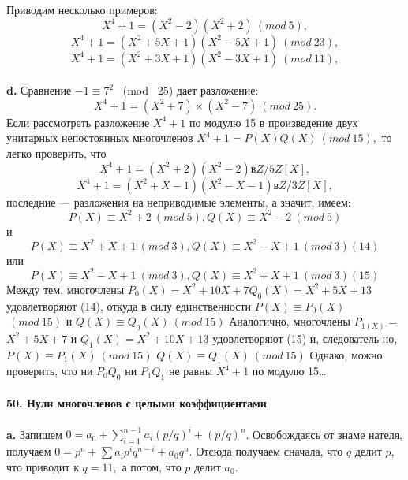 \documentclass{mai_book}
\begin{document}
\pagebreak
\noindent Приводим несколько примеров:
$$X^{4} + 1 = (X^{2} - 2 )(X^{2} + 2) ~(mod~ 5),$$
$$X^{4} + 1 = (X^{2} + 5X + 1 )(X^{2} - 5X + 1) ~(mod~ 23),$$
$$X^{4} + 1 = (X^{2} + 3X + 1 )(X^{2} - 3X + 1) ~(mod~ 11),$$
\\
\hspace*{15pt}\textbf{d.} Сравнение $-1 \equiv 7^{2}$ ~(mod~ 25) дает разложение:
$$X^{4} + 1 = (X^{2} +7) \times (X^{2} - 7) ~(mod~ 25).$$
Если рассмотреть разложение $X^{4} + 1$ по модулю 15 в произведение двух\linebreak
унитарных непостоянных многочленов $X^{4} + 1 = P(X)Q(X) ~(mod~ 15),$\linebreak
то легко проверить, что
$$X^{4} + 1 = (X^{2} + 2 )(X^{2} - 2) в Z/5Z[X],$$
$$X^{4} + 1 = (X^{2} + X - 1 )(X^{2} - X - 1) в Z/3Z[X],$$
последние --- разложения на неприводимые элементы, а значит, имеем: 
$$P(X) \equiv X^{2} + 2 ~(mod~ 5), Q(X) \equiv X^{2} - 2 ~(mod~ 5)$$
и
$$P(X) \equiv X^{2} + X + 1 ~(mod~ 3), Q(X) \equiv X^{2} - X + 1 ~(mod~ 3)   (14)$$
или
$$P(X) \equiv X^{2} - X + 1 ~(mod~ 3), Q(X) \equiv X^{2} + X + 1 ~(mod~ 3)   (15)$$
Между тем, многочлены $P_{0}(X) = X^{2} + 10X + 7   Q_{0}(X) = X^{2} + 5X + 13$\linebreak
удовлетворяют (14), откуда в силу единственности $P(X) \equiv P_{0}(X)$\linebreak
$~(mod~ 15)$ и $Q(X) \equiv Q_0(X) ~(mod~ 15)$ Аналогично, многочлены $P_{1(X)} =$\linebreak
$X^{2} + 5X + 7$ и $Q_{1}(X) = X^{2} + 10X + 13$ удовлетворяют (15) и, следователь­\linebreak
но,$P(X) \equiv P_{1}(X) ~(mod~ 15)$ $Q(X) \equiv Q_{1}(X) ~(mod~ 15)$ Однако, можно\linebreak
проверить, что ни $P_0Q_0$ ни $P_1Q_1$  не равны $X^{4} + 1$ по модулю 15\ldots\\
\\
\noindent\textbf{50. Нули многочленов с целыми коэффициентами}\\
\\
\hspace*{15pt}\textbf{a.}  Запишем $0 = a_0+\sum^{n-1}_{i=1}a_{i}(p/q)^{i} + (p/q)^{n}$. Освобождаясь от знаме­
нателя, получаем $0 = p^{n}+\sum a_{i}p^{i}q^{n-i}+a_{0}q^{n}.$ Отсюда получаем сначала, 
что $q$ делит $p$, что приводит к $q = 11,$ а потом, что $p$ делит $a_0$.
\end{document}
